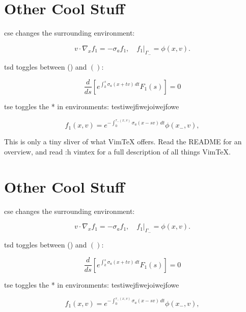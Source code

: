 \documentclass{article}
\begin{document}
\section{Other Cool Stuff}

cse changes the surrounding environment:

\begin{equation}
  v \cdot \nabla_x f_1 = -\sigma_a f_1, \quad f_1 \rvert_{\Gamma_-} = \phi(x,v).
\end{equation}

tsd toggles between () and \( \left( \right) \):

\begin{equation*}
  \frac{d}{ds} \left[ e^{\int_k^s \sigma_a(x + tv)\,dt} F_1(s) \right] = 0
\end{equation*}

tse toggles the * in environments:
testiwejfiwejoiwejfowe

\begin{equation}
  f_1(x, v) = e^{-\int_0^{\tau_-(x, v)} \sigma_a(x - sv)\,dt} \phi(x_-, v),
\end{equation}

This is only a tiny sliver of what VimTeX offers.
Read the README for an overview, and read :h vimtex for a full description of
all things VimTeX.




\section{Other Cool Stuff}

cse changes the surrounding environment:

\begin{equation}
  v \cdot \nabla_x f_1 = -\sigma_a f_1, \quad f_1 \rvert_{\Gamma_-} = \phi(x,v).
\end{equation}

tsd toggles between () and \( \left( \right) \):

\begin{equation*}
  \frac{d}{ds} \left[ e^{\int_k^s \sigma_a(x + tv)\,dt} F_1(s) \right] = 0
\end{equation*}

tse toggles the * in environments:
testiwejfiwejoiwejfowe

\begin{equation}
  f_1(x, v) = e^{-\int_0^{\tau_-(x, v)} \sigma_a(x - sv)\,dt} \phi(x_-, v),
\end{equation}
\end{document}
